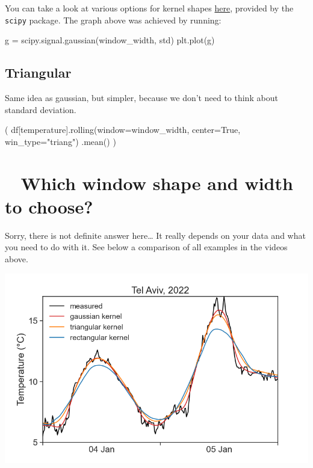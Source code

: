 \documentclass[
  letterpaper,
  DIV=11,
  numbers=noendperiod,
  oneside]{scrreprt}
\newenvironment{Shaded}{\begin{snugshade}}{\end{snugshade}}
\newcommand{\NormalTok}[1]{\textcolor[rgb]{0.00,0.23,0.31}{#1}}
\newcommand{\OperatorTok}[1]{\textcolor[rgb]{0.37,0.37,0.37}{#1}}
\newcommand{\StringTok}[1]{\textcolor[rgb]{0.13,0.47,0.30}{#1}}
\newcommand{\VariableTok}[1]{\textcolor[rgb]{0.07,0.07,0.07}{#1}}
\begin{document}
You can take a look at various options for kernel shapes
\href{https://docs.scipy.org/doc/scipy/reference/signal.windows.html\#module-scipy.signal.windows}{here},
provided by the \texttt{scipy} package. The graph above was achieved by
running:

\begin{Shaded}
\begin{Highlighting}[]
\NormalTok{g }\OperatorTok{=}\NormalTok{ scipy.signal.gaussian(window\_width, std)}
\NormalTok{plt.plot(g)}
\end{Highlighting}
\end{Shaded}

\hypertarget{triangular}{%
\subsection{Triangular}\label{triangular}}

Same idea as gaussian, but simpler, because we don't need to think about
standard deviation.

\begin{Shaded}
\begin{Highlighting}[]
\NormalTok{(}
\NormalTok{df[}\StringTok{\textquotesingle{}temperature\textquotesingle{}}\NormalTok{].rolling(window}\OperatorTok{=}\NormalTok{window\_width,}
\NormalTok{                          center}\OperatorTok{=}\VariableTok{True}\NormalTok{,}
\NormalTok{                          win\_type}\OperatorTok{=}\StringTok{"triang"}\NormalTok{)}
\NormalTok{                 .mean()}
\NormalTok{)}
\end{Highlighting}
\end{Shaded}

\hypertarget{which-window-shape-and-width-to-choose}{%
\section{🤷‍♂️ Which window shape and width to
choose?}\label{which-window-shape-and-width-to-choose}}

Sorry, there is not definite answer here\ldots{} It really depends on
your data and what you need to do with it. See below a comparison of all
examples in the videos above.

\includegraphics{smoothing/kernel_comparison.png}
\end{document}
